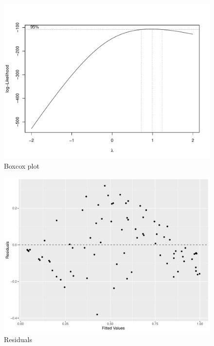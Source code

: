 \documentclass[12pt,a4paper]{article}
\begin{document}
\begin{appendices}
\newpage
\begin{figure}[H]
	\includegraphics[width=\linewidth]{boxcox.pdf}
	\caption{Boxcox plot}	 %
	\label{fig:boxcox}
\end{figure}

\begin{figure}[H]
	\includegraphics[width=\linewidth]{residuals.pdf}
	\caption{Residuals}	 %
	\label{fig:residuals}
\end{figure}


\end{appendices}
\end{document}

